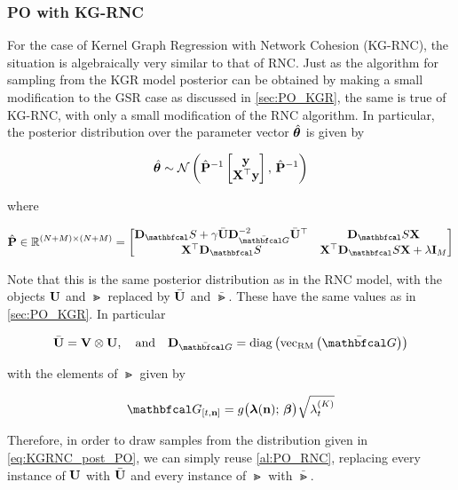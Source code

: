 \subsubsection{PO with KG-RNC}

\label{sec:PO_KGRNC}

For the case of Kernel Graph Regression with Network Cohesion (KG-RNC), the situation is algebraically very similar to that of RNC. Just as the algorithm for sampling from the KGR model posterior can be obtained by making a small modification to the GSR case as discussed in \cref{sec:PO_KGR}, the same is true of KG-RNC, with only a small modification of the RNC algorithm. In particular, the posterior distribution over the parameter vector $\hat{\boldsymbol{\theta}}$ is given by 

\begin{equation}
    \label{eq:KGRNC_post_PO}
    \hat{\boldsymbol{\theta}} \sim \mathcal{N}\left(\hat{\mathbf{P}}^{-1} \begin{bmatrix} \mathbf{y} \\ \mathbf{X}^\top \mathbf{y} \end{bmatrix}, \, \hat{\mathbf{P}}^{-1}\right)
\end{equation}

where 

\begin{equation}
    \hat{\PP} \in \R^{(N + M) \times (N + M)}= 
    \begin{bmatrix}
     \D_\St + \gamma \bar{\U} \D_{\bar{\Gt}}^{-2} \bar{\U}^\top & \D_\St  \X \\
     \X^\top \D_\St & \X^\top \D_\St \X + \lambda \I_M   
    \end{bmatrix}
\end{equation}

Note that this is the same posterior distribution as in the RNC model, with the objects $\mathbf{U}$ and $\Gt$ replaced by $\bar{\mathbf{U}}$ and $\bar{\Gt}$. These have the same values as in \cref{sec:PO_KGR}. In particular

\begin{equation}
    \bar{\U} = \V \otimes \U, \aand \D_{\bar{\Gt}} = \diag{\vecrm{\bar{\Gt}}}
\end{equation}

with the elements of $\Gt$ given by 

\begin{equation}
    \Gt_{[t, \nn]} = g\big(\lambdaa(\nn); \, \betaa\big) \sqrt{\lambda^{(K)}_t} 
\end{equation}

Therefore, in order to draw samples from the distribution given in \cref{eq:KGRNC_post_PO}, we can simply reuse \cref{al:PO_RNC}, replacing every instance of $\mathbf{U}$ with $\bar{\mathbf{U}}$ and every instance of $\Gt$ with $\bar{\Gt}$. 

